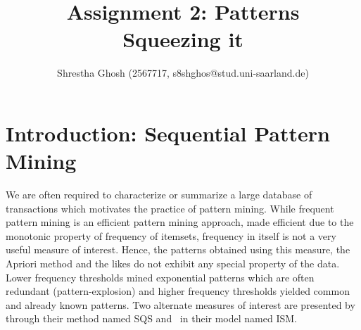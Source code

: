 \documentclass[10pt]{article}
\title{Assignment 2: Patterns\\
      Squeezing it}
\author{Shrestha Ghosh (2567717, s8shghos@stud.uni-saarland.de)}
\begin{document}
\maketitle
\section{Introduction: Sequential Pattern Mining}
\par We are often required to characterize or summarize a large database of transactions which motivates the practice of pattern mining. While frequent pattern mining is an efficient pattern mining approach, made efficient due to the monotonic property of frequency of itemsets, frequency in itself is not a very useful measure of interest. Hence, the patterns obtained using this measure, the Apriori method and the likes do not exhibit any special property of the data. Lower frequency thresholds mined exponential patterns which are often redundant (pattern-explosion) and higher frequency thresholds yielded common and already known patterns. Two alternate measures of interest are presented by~\citet{tatti2012long} through their method named SQS and~\citet{fowkes2016subsequence} in their model named ISM.
\end{document}
